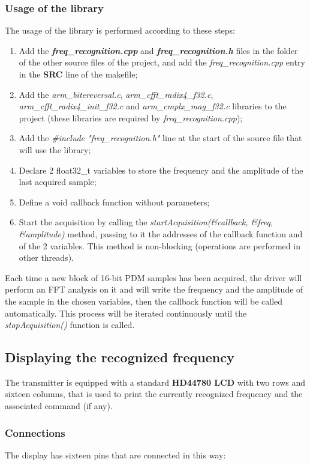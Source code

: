 \subsubsection{Usage of the library}
The usage of the library is performed according to these steps:
\begin{enumerate}
	\item Add the \textbf{\textit{freq\_recognition.cpp}} and \textbf{\textit{freq\_recognition.h}} files in the folder of the other source files of the project, and add the \textit{freq\_recognition.cpp} entry in the \textbf{SRC} line of the makefile;
	\item Add the \textit{arm\_bitereversal.c}, \textit{arm\_cfft\_radix4\_f32.c}, \textit{arm\_cfft\_radix4\_init\_f32.c} and \textit{arm\_cmplx\_mag\_f32.c} libraries to the project (these libraries are required by \textit{freq\_recognition.cpp});
	\item Add the \textit{\#include "freq\_recognition.h"} line at the start of the source file that will use the library;
	\item Declare 2 float32\_t variables to store the frequency and the amplitude of the last acquired sample;
	\item Define a void callback function without parameters;
	\item Start the acquisition by calling the \textit{startAcquisition(\&callback, \&freq, \&amplitude)} method, passing to it the addresses of the callback function and of the 2 variables. This method is non-blocking (operations are performed in other threads).
\end{enumerate}
Each time a new block of 16-bit PDM samples has been acquired, the driver will perform an FFT analysis on it and will write the frequency and the amplitude of the sample in the chosen variables, then the callback function will be called automatically. This process will be iterated continuously until the \textit{stopAcquisition()} function is called.

\subsection{Displaying the recognized frequency}
The transmitter is equipped with a standard \textbf{HD44780 LCD} with two rows and sixteen columns, that is used to print the currently recognized frequency and the associated command (if any).

\subsubsection{Connections}
The display has sixteen pins that are connected in this way:

